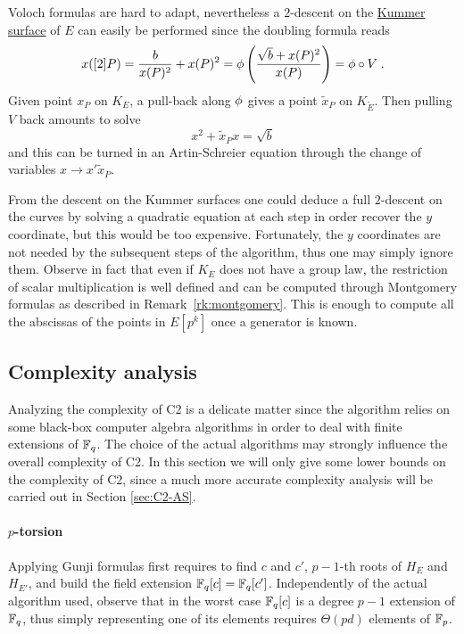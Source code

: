 Voloch formulas are hard to adapt, nevertheless a $2$-descent on the
\hyperref[def:kummer]{Kummer surface} of $E$ can easily be performed
since the doubling formula reads
\begin{equation}
  x([2]P) = \frac{b}{x(P)^2} + x(P)^2 =
  \phi\left(\frac{\sqrt{b} + x(P)^2}{x(P)} \right) = \phi\circ V
  \;\text{.}
\end{equation}
Given point $x_P$ on $K_E$, a pull-back along $\phi$ gives a
point $\tilde{x}_P$ on $K_{\widetilde{E}}$. Then pulling $V$ back
amounts to solve
\begin{equation}
  \label{eq:2-descent}
  x^2 + \tilde{x}_Px = \sqrt{b}
\end{equation}
and this can be turned in an Artin-Schreier equation through the
change of variables $x \rightarrow x'\tilde{x}_P$.

From the descent on the Kummer surfaces one could deduce a full
$2$-descent on the curves by solving a quadratic equation at each step
in order recover the $y$ coordinate, but this would be too
expensive. Fortunately, the $y$ coordinates are not needed by the
subsequent steps of the algorithm, thus one may simply ignore
them. Observe in fact that even if $K_E$ does not have a group law,
the restriction of scalar multiplication is well defined and can be
computed through Montgomery formulas as described in
Remark~\ref{rk:montgomery}. This is enough to compute all the
abscissas of the points in $E[p^k]$ once a generator is known.


\subsection{Complexity analysis}
\label{sec:C2:complexity}
Analyzing the complexity of C2 is a delicate matter since the
algorithm relies on some black-box computer algebra algorithms in
order to deal with finite extensions of $\mathbb{F}_q$. The choice of the
actual algorithms may strongly influence the overall complexity of C2.
In this section we will only give some lower bounds on the complexity
of C2, since a much more accurate complexity analysis will be carried
out in Section \ref{sec:C2-AS}.

\paragraph{$p$-torsion}
Applying Gunji formulas first requires to find $c$ and $c'$, $p-1$-th
roots of $H_E$ and $H_{E'}$, and build the field extension $\mathbb{F}_q[c] =
\mathbb{F}_q[c']$. Independently of the actual algorithm used, observe that in
the worst case $\mathbb{F}_q[c]$ is a degree $p-1$ extension of $\mathbb{F}_q$, thus
simply representing one of its elements requires $\Theta(pd)$ elements
of $\mathbb{F}_p$.

